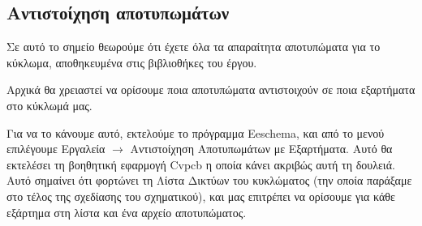 \documentclass[a4paper]{article}
\begin{document}

\subsection{Αντιστοίχηση αποτυπωμάτων}
Σε αυτό το σημείο θεωρούμε ότι έχετε όλα τα απαραίτητα αποτυπώματα για το κύκλωμα, αποθηκευμένα στις βιβλιοθήκες του έργου.

Αρχικά θα χρειαστεί να ορίσουμε ποια αποτυπώματα αντιστοιχούν σε ποια εξαρτήματα στο κύκλωμά μας. 

Για να το κάνουμε αυτό, εκτελούμε το πρόγραμμα Eeschema, και από το μενού επιλέγουμε Εργαλεία $\rightarrow$ Αντιστοίχηση Αποτυπωμάτων με Εξαρτήματα. Αυτό θα εκτελέσει τη βοηθητική εφαρμογή \textenglish{Cvpcb} η οποία κάνει ακριβώς αυτή τη δουλειά. Αυτό σημαίνει ότι φορτώνει τη Λίστα Δικτύων του κυκλώματος (την οποία παράξαμε στο τέλος της σχεδίασης του σχηματικού), και μας επιτρέπει να ορίσουμε για κάθε εξάρτημα στη λίστα και ένα αρχείο αποτυπώματος.
\end{document}
